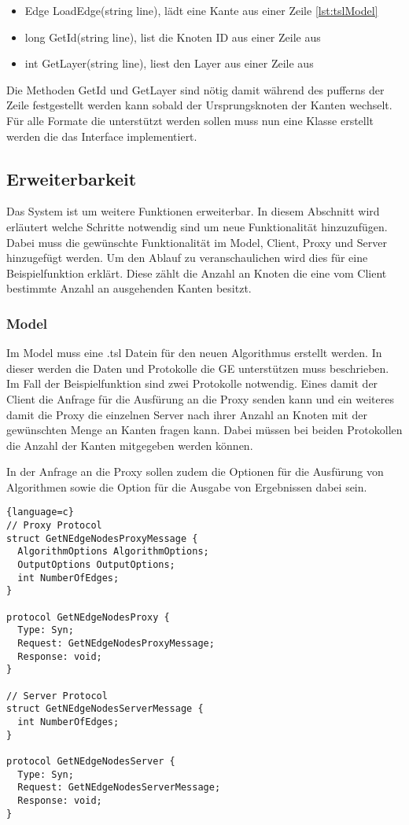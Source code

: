\begin{itemize}
  \item Edge LoadEdge(string line), lädt eine Kante aus einer Zeile \ref{lst:tslModel}
  \item long GetId(string line), list die Knoten ID aus einer Zeile aus
  \item int GetLayer(string line), liest den Layer aus einer Zeile aus
\end{itemize}

Die Methoden GetId und GetLayer sind nötig damit während des pufferns der Zeile festgestellt werden kann sobald der Ursprungsknoten der Kanten wechselt.
Für alle Formate die unterstützt werden sollen muss nun eine Klasse erstellt werden die das Interface implementiert.



\subsection{Erweiterbarkeit}

Das System ist um weitere Funktionen erweiterbar. In diesem Abschnitt wird erläutert welche Schritte notwendig sind um neue Funktionalität hinzuzufügen.
Dabei muss die gewünschte Funktionalität im Model, Client, Proxy und Server hinzugefügt werden. Um den Ablauf zu veranschaulichen wird dies für eine Beispielfunktion erklärt. Diese zählt die Anzahl an Knoten die eine vom Client bestimmte Anzahl an ausgehenden Kanten besitzt.

\subsubsection{Model}

Im Model muss eine .tsl Datein für den neuen Algorithmus erstellt werden. In dieser werden die Daten und Protokolle die GE unterstützen muss beschrieben. Im Fall der Beispielfunktion sind zwei Protokolle notwendig.
Eines damit der Client die Anfrage für die Ausfürung an die Proxy senden kann und ein weiteres damit die Proxy die einzelnen Server nach ihrer Anzahl an Knoten mit der gewünschten Menge an Kanten fragen kann.
Dabei müssen bei beiden Protokollen die Anzahl der Kanten mitgegeben werden können.

In der Anfrage an die Proxy sollen zudem die Optionen für die Ausfürung von Algorithmen sowie die Option für die Ausgabe von Ergebnissen dabei sein.

\begin{lstlisting}{language=c}
// Proxy Protocol
struct GetNEdgeNodesProxyMessage {
  AlgorithmOptions AlgorithmOptions;
  OutputOptions OutputOptions;
  int NumberOfEdges;  
}

protocol GetNEdgeNodesProxy {
  Type: Syn;
  Request: GetNEdgeNodesProxyMessage;
  Response: void;
}

// Server Protocol
struct GetNEdgeNodesServerMessage {
  int NumberOfEdges;
}

protocol GetNEdgeNodesServer {
  Type: Syn;
  Request: GetNEdgeNodesServerMessage;
  Response: void;
}
\end{lstlisting}

